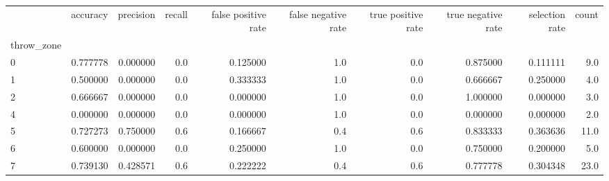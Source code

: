 \begin{tabular}{lrrrrrrrrr}
\toprule
{} &  accuracy &  precision &  recall &  false positive rate &  false negative rate &  true positive rate &  true negative rate &  selection rate &  count \\
throw\_zone &           &            &         &                      &                      &                     &                     &                 &        \\
\midrule
0          &  0.777778 &   0.000000 &     0.0 &             0.125000 &                  1.0 &                 0.0 &            0.875000 &        0.111111 &    9.0 \\
1          &  0.500000 &   0.000000 &     0.0 &             0.333333 &                  1.0 &                 0.0 &            0.666667 &        0.250000 &    4.0 \\
2          &  0.666667 &   0.000000 &     0.0 &             0.000000 &                  1.0 &                 0.0 &            1.000000 &        0.000000 &    3.0 \\
4          &  0.000000 &   0.000000 &     0.0 &             0.000000 &                  1.0 &                 0.0 &            0.000000 &        0.000000 &    2.0 \\
5          &  0.727273 &   0.750000 &     0.6 &             0.166667 &                  0.4 &                 0.6 &            0.833333 &        0.363636 &   11.0 \\
6          &  0.600000 &   0.000000 &     0.0 &             0.250000 &                  1.0 &                 0.0 &            0.750000 &        0.200000 &    5.0 \\
7          &  0.739130 &   0.428571 &     0.6 &             0.222222 &                  0.4 &                 0.6 &            0.777778 &        0.304348 &   23.0 \\
\bottomrule
\end{tabular}
